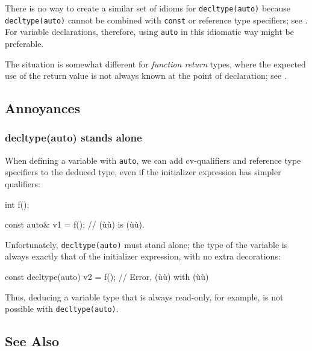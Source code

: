There is no way to create a similar set of idioms for
\lstinline!decltype(auto)! because \lstinline!decltype(auto)! cannot be
combined with \lstinline!const! or reference type specifiers; see\linebreak%
. For variable
declarations, therefore, using \lstinline!auto! in this idiomatic way might
be preferable.

The situation is somewhat different for \emph{function return} types,
where the expected use of the return value is not always known at the
point of declaration; see .

\subsection[Annoyances]{Annoyances}\label{annoyances-decltypeauto}

\subsubsection[\lstinline!decltype(auto)! stands alone]{{\SubsubsecCode decltype(auto)} stands alone}\label{decltype(auto)-stands-alone}

When defining a variable with \lstinline!auto!, we can add cv-qualifiers
and reference type specifiers to the deduced type, even if the
initializer expression has simpler qualifiers:

\begin{emcppslisting}
int f();

const auto& v1 = f();  // (ù{}ù) is (ù{}ù).
\end{emcppslisting}
    

Unfortunately, \lstinline!decltype(auto)! must stand alone; the type of the
variable is always exactly that of the initializer expression, with no
extra decorations:

\begin{emcppslisting}
const decltype(auto) v2 = f();  // Error, (ù{}ù) with (ù{}ù)
\end{emcppslisting}
    

Thus, deducing a variable type that is always read-only, for example, is
not possible with \lstinline!decltype(auto)!.

\subsection[See Also]{See Also}\label{see-also}

